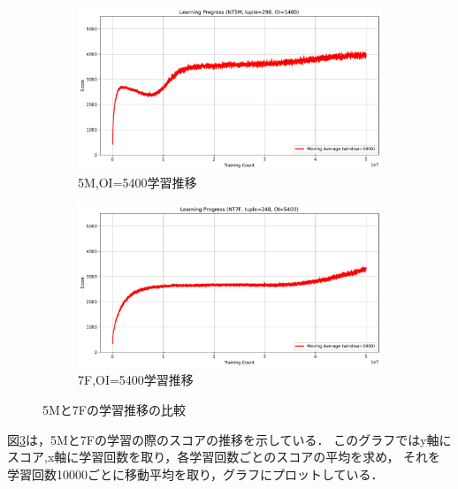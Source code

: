 \begin{figure}[t]
    \vspace{1em}
    \begin{subfigure}[b]{0.49\linewidth}
        \includegraphics[width=\linewidth]{pdf/learning_progress_plots/learning_progress_NT5_tuple298_OI5400.pdf}
        \caption{5M,OI=5400学習推移}
        \label{fig:NT5M_OI5400_learning_progress}
    \end{subfigure}
    \begin{subfigure}[b]{0.49\linewidth}
        \includegraphics[width=\linewidth]{pdf/learning_progress_plots/learning_progress_NT7_tuple248_OI5400.pdf}
        \caption{7F,OI=5400学習推移}
        \label{fig:NT7F_OI5400_learning_progress}
    \end{subfigure}

    \caption{5Mと7Fの学習推移の比較}
    \label{fig:learning_progress_comparison}
\end{figure}

図\ref{fig:learning_progress_comparison}は，5Mと7Fの学習の際のスコアの推移を示している．
このグラフではy軸にスコア,x軸に学習回数を取り，各学習回数ごとのスコアの平均を求め，
それを学習回数10000ごとに移動平均を取り，グラフにプロットしている．

